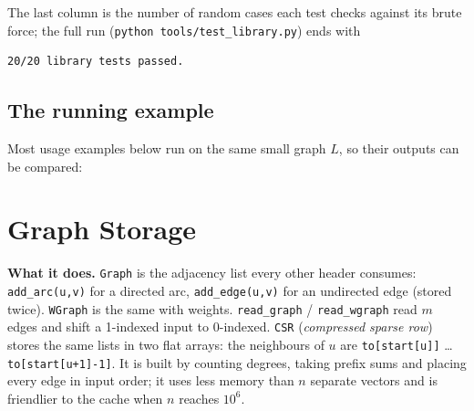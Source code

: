 The last column is the number of random cases each test checks against its brute force; the full run (\texttt{python tools/test\_library.py}) ends with
\begin{lstlisting}[style=trace]
20/20 library tests passed.
\end{lstlisting}

\subsection*{The running example}

Most usage examples below run on the same small graph $L$, so their outputs can be compared:

\begin{diagrambox}
\end{diagrambox}

\clneed
\section{Graph Storage}
\label{sec:cl-graph}

\textbf{What it does.} \texttt{Graph} is the adjacency list every other header consumes: \texttt{add\_arc(u,v)} for a directed arc, \texttt{add\_edge(u,v)} for an undirected edge (stored twice). \texttt{WGraph} is the same with weights. \texttt{read\_graph} / \texttt{read\_wgraph} read $m$ edges and shift a 1-indexed input to 0-indexed. \texttt{CSR} (\emph{compressed sparse row}) stores the same lists in two flat arrays: the neighbours of $u$ are \texttt{to[start[u]]} \ldots{} \texttt{to[start[u+1]-1]}. It is built by counting degrees, taking prefix sums and placing every edge in input order; it uses less memory than $n$ separate vectors and is friendlier to the cache when $n$ reaches $10^6$.

